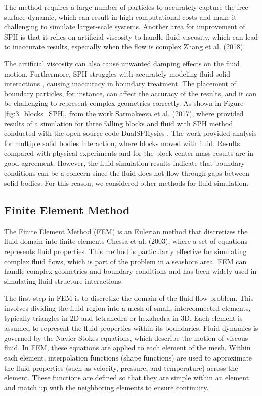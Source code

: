 The method requires a large number of particles to accurately capture the free-surface dynamic, which can result in high computational costs and make it challenging to simulate larger-scale systems. Another area for improvement of SPH is that it relies on artificial viscosity to handle fluid viscosity, which can lead to inaccurate results, especially when the flow is complex Zhang et al. (2018)\cite{zhang2018dualsphysics}. 

The artificial viscosity can also cause unwanted damping effects on the fluid motion. Furthermore, SPH struggles with accurately modeling fluid-solid interactions \cite{Dual_SPH2019accuracy}, causing inaccuracy in boundary treatment. The placement of boundary particles, for instance, can affect the accuracy of the results, and it can be challenging to represent complex geometries correctly. As shown in Figure \ref{fig:3_blocks_SPH}, from the work Sarmakeeva et al. (2017)\cite{sarmakeeva2017meshfree}, where provided results of a simulation for three falling blocks and fluid with SPH method conducted with the open-source code DualSPHysics \cite{Dual_SPH2019accuracy}. The work provided analysis for multiple solid bodies interaction, where blocks moved with fluid. Results compared with physical experiments and for the block center mass results are in good agreement. However, the fluid simulation results indicate that boundary conditions can be a concern since the fluid does not flow through gaps between solid bodies. For this reason, we considered other methods for fluid simulation.

\subsection{Finite Element Method}
The Finite Element Method (FEM) is an Eulerian method that discretizes the fluid domain into finite elements Chessa et al. (2003)\cite{FEM}, where a set of equations represents fluid properties. This method is particularly effective for simulating complex fluid flows, which is part of the problem in a seashore area. FEM can handle complex geometries and boundary conditions and has been widely used in simulating fluid-structure interactions.

The first step in FEM is to discretize the domain of the fluid flow problem. This involves dividing the fluid region into a mesh of small, interconnected elements, typically triangles in 2D and tetrahedra or hexahedra in 3D. Each element is assumed to represent the fluid properties within its boundaries. Fluid dynamics is governed by the Navier-Stokes equations, which describe the motion of viscous fluid. In FEM, these equations are applied to each element of the mesh. Within each element, interpolation functions (shape functions) are used to approximate the fluid properties (such as velocity, pressure, and temperature) across the element. These functions are defined so that they are simple within an element and match up with the neighboring elements to ensure continuity. 

